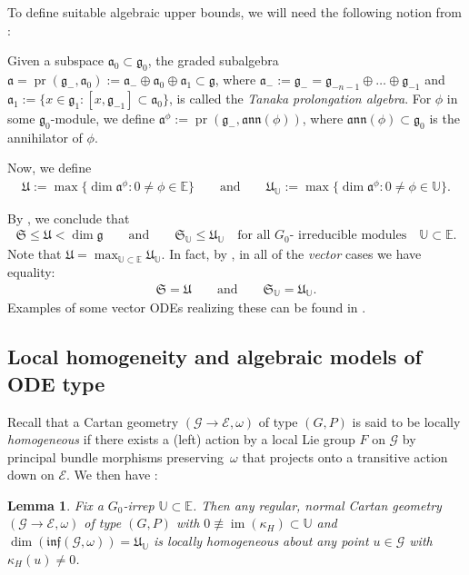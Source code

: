 \documentclass[pdftex]{sigma}%
\DeclareMathOperator{\pr}{pr}
\DeclareMathOperator{\img}{im}
\newcommand{\g}{\mathfrak{g}}
\newcommand\cG{\mathcal{G}}
\newcommand\fa{\mathfrak{a}}
\newcommand\fann{\mathfrak{ann}}
\newcommand\finf{\mathfrak{inf}}
\newcommand\fS{\mathfrak{S}}
\newcommand\fU{\mathfrak{U}}
\newcommand\bbE{\mathbb{E}}
\newcommand\bbU{\mathbb{U}}
\newcommand\cE{\mathcal{E}}
\numberwithin{equation}{section}
\newtheorem{Lemma}[Theorem]{Lemma}
\begin{document}
To define suitable algebraic upper bounds, we will need the following notion from \cite{KT2017}:
\begin{Definition} \label{D:TA}
Given a subspace $\fa_0 \subset \g_0$, the graded subalgebra $\fa = \pr(\g_-,\fa_0) := \fa_- \oplus \fa_0 \oplus \fa_1 \subset \g$, where $\fa_- :=\g_- = \g_{-n-1} \oplus \dots \oplus \g_{-1}$ and $\fa_1 :=\{x \in \g_1\colon [x,\g_{-1}] \subset \fa_0\}$, is called the {\em Tanaka prolongation algebra}. For $\phi$ in some $\g_0$-module, we define $\fa^\phi := \pr(\g_-,\fann(\phi))$, where $\fann (\phi) \subset \g_0$ is the annihilator of $\phi$.
\end{Definition}
Now, we define
\begin{align}\label{E:UU}
\fU := \max \bigl\{\dim \fa^\phi \colon 0 \ne \phi \in \bbE \bigr\} \qquad \text{and} \qquad \fU_\bbU := \max \bigl\{\dim \fa^\phi\colon 0 \ne \phi \in \bbU \bigr\}.
\end{align}

By \cite[Theorem~2.11]{KT2021}, we conclude that
\begin{align} \label{E:SU}
\fS \le \fU < \dim \g \qquad \text{and}\qquad \fS_\bbU \le \fU_\bbU \quad \text{for all $G_0$- irreducible modules}\quad \bbU \subset \bbE.
\end{align}
Note that $\fU = \max_{\bbU \subset \bbE} \fU_\bbU$. In fact, by \cite[Theorem~1.2]{KT2021}, in all of the {\em vector} cases we have equality:
\begin{align*}
\fS = \fU \qquad \text{and} \qquad \fS_\bbU = \fU_\bbU.
\end{align*}
Examples of some vector ODEs realizing these can be found in \cite[Tables 8 and~10]{KT2021}.

\subsection{Local homogeneity and algebraic models of ODE type}\label{S:AlgM}
Recall that a Cartan geometry $(\cG \to \cE, \omega)$ of type $(G,P)$ is said to be locally {\em homogeneous} if there exists a (left) action by a local Lie group $F$ on $\cG$ by principal bundle morphisms preserving~$\omega$ that projects onto a transitive action down on $\cE$. We then have \cite[Lemma~A.1]{KT2021}:
\begin{Lemma}\label{L:LoHom}
Fix a $G_0$-irrep $\bbU \subset \bbE$. Then any regular, normal Cartan geometry $(\cG \to \cE, \omega)$ of type $(G,P)$ with $ 0 \not\equiv \img(\kappa_H) \subset \bbU$ and $\dim (\finf(\cG, \omega)) = \fU_\bbU$ is locally homogeneous about any point $u \in \cG$ with $\kappa_H(u) \ne 0$.	
\end{Lemma}
\end{document}
